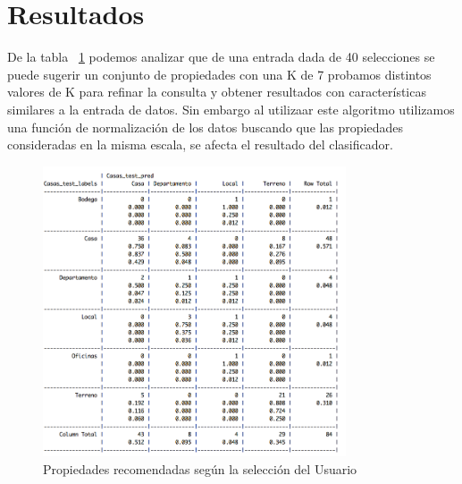 \section{Resultados}
De la tabla ~\ref{fig:Clasificador} podemos analizar que de una entrada dada de 40 selecciones se puede sugerir un conjunto de propiedades con una K de 7 probamos distintos valores de K para refinar la consulta y obtener resultados con características similares a la entrada de datos.
Sin embargo al utilizaar este algoritmo utilizamos una función de normalización de los datos buscando que las propiedades consideradas en la misma escala, se afecta el resultado del clasificador.


\begin{figure}[ht!]
\centering
\includegraphics[width=0.8\textwidth]{ModeloPredictivo.png}
\caption{Propiedades recomendadas según la selección del Usuario}
\label{fig:Clasificador}
\end{figure}